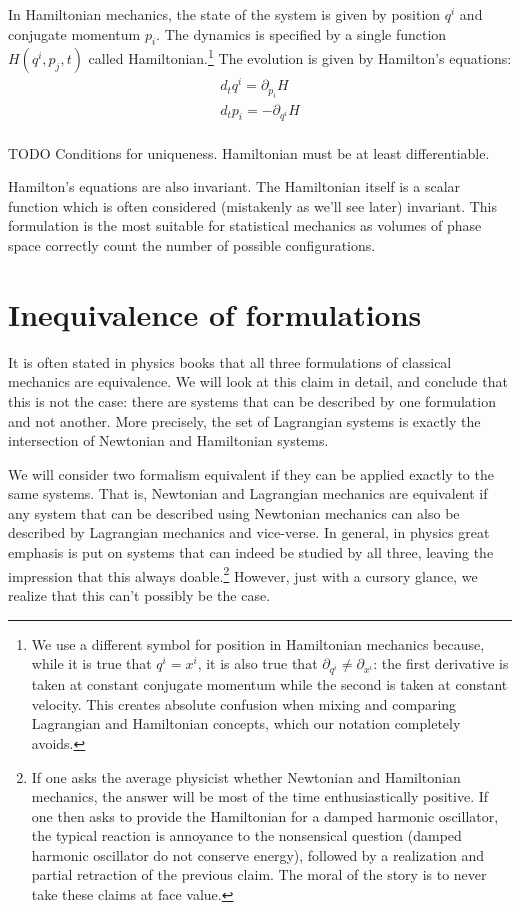 In Hamiltonian mechanics, the state of the system is given by position $q^i$ and conjugate momentum $p_i$. The dynamics is specified by a single function $H(q^i, p_j, t)$ called Hamiltonian.\footnote{We use a different symbol for position in Hamiltonian mechanics because, while it is true that $q^i = x^i$, it is also true that $\partial_{q^i} \neq \partial_{x^i}$: the first derivative is taken at constant conjugate momentum while the second is taken at constant velocity. This creates absolute confusion when mixing and comparing Lagrangian and Hamiltonian concepts, which our notation completely avoids.} The evolution is given by Hamilton's equations:
\begin{equation}\label{rp-cm-HamiltonEq}
	\begin{aligned}
		d_t q^i = \partial_{p_i} H \\
		d_t p_i = - \partial_{q^i} H \\
	\end{aligned}
\end{equation}

TODO Conditions for uniqueness. Hamiltonian must be at least differentiable.

Hamilton's equations are also invariant. The Hamiltonian itself is a scalar function which is often considered (mistakenly as we'll see later) invariant. This formulation is the most suitable for statistical mechanics as volumes of phase space correctly count the number of possible configurations.

\section{Inequivalence of formulations}

It is often stated in physics books that all three formulations of classical mechanics are equivalence. We will look at this claim in detail, and conclude that this is not the case: there are systems that can be described by one formulation and not another. More precisely, the set of Lagrangian systems is exactly the intersection of Newtonian and Hamiltonian systems.

We will consider two formalism equivalent if they can be applied exactly to the same systems. That is, Newtonian and Lagrangian mechanics are equivalent if any system that can be described using Newtonian mechanics can also be described by Lagrangian mechanics and vice-verse. In general, in physics great emphasis is put on systems that can indeed be studied by all three, leaving the impression that this always doable.\footnote{If one asks the average physicist whether Newtonian and Hamiltonian mechanics, the answer will be most of the time enthusiastically positive. If one then asks to provide the Hamiltonian for a damped harmonic oscillator, the typical reaction is annoyance to the nonsensical question (damped harmonic oscillator do not conserve energy), followed by a realization and partial retraction of the previous claim. The moral of the story is to never take these claims at face value.} However, just with a cursory glance, we realize that this can't possibly be the case.

